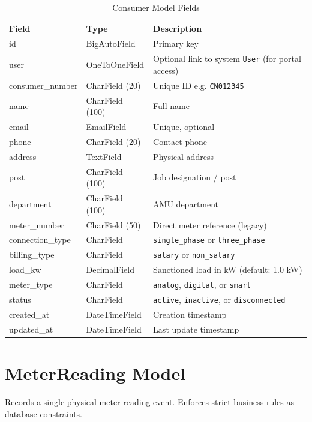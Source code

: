 \documentclass[12pt, a4paper]{report}
\begin{document}
\begin{table}[H]
\centering
\caption{Consumer Model Fields}
\begin{tabularx}{\textwidth}{>{\ttfamily}l l X}
\toprule
\textbf{Field} & \textbf{Type} & \textbf{Description} \\
\midrule
id & BigAutoField & Primary key \\
user & OneToOneField & Optional link to system \texttt{User} (for portal access) \\
consumer\_number & CharField (20) & Unique ID e.g. \texttt{CN012345} \\
name & CharField (100) & Full name \\
email & EmailField & Unique, optional \\
phone & CharField (20) & Contact phone \\
address & TextField & Physical address \\
post & CharField (100) & Job designation / post \\
department & CharField (100) & AMU department \\
meter\_number & CharField (50) & Direct meter reference (legacy) \\
connection\_type & CharField & \texttt{single\_phase} or \texttt{three\_phase} \\
billing\_type & CharField & \texttt{salary} or \texttt{non\_salary} \\
load\_kw & DecimalField & Sanctioned load in kW (default: 1.0 kW) \\
meter\_type & CharField & \texttt{analog}, \texttt{digital}, or \texttt{smart} \\
status & CharField & \texttt{active}, \texttt{inactive}, or \texttt{disconnected} \\
created\_at & DateTimeField & Creation timestamp \\
updated\_at & DateTimeField & Last update timestamp \\
\bottomrule
\end{tabularx}
\end{table}

\section{MeterReading Model}

Records a single physical meter reading event. Enforces strict business rules as database constraints.
\end{document}
